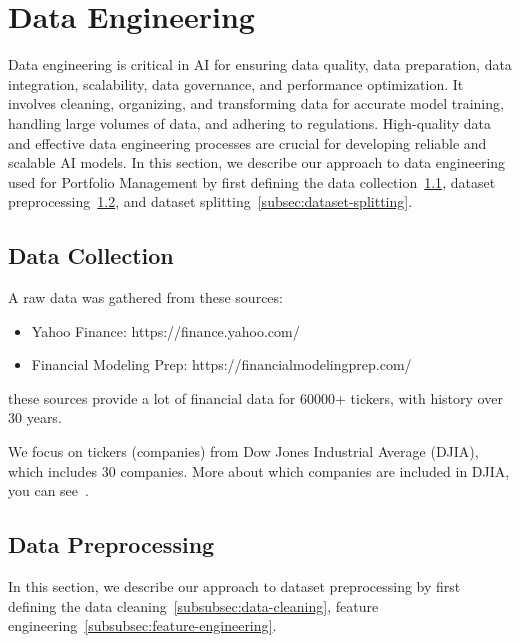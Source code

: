 \documentclass[../xlapes02]{subfiles}
\begin{document}
    \section{Data Engineering}\label{sec:data-engineering}
    Data engineering is critical in AI for ensuring data quality, data preparation, data integration, scalability, data governance, and performance optimization. It involves cleaning, organizing, and transforming data for accurate model training, handling large volumes of data, and adhering to regulations. High-quality data and effective data engineering processes are crucial for developing reliable and scalable AI models. In this section, we describe our approach to data engineering used for Portfolio Management by first defining the data collection~\cref{subsec:data-collection}, dataset preprocessing~\cref{subsec:dataset-preprocessing}, and dataset splitting~\cref{subsec:dataset-splitting}.

    \subsection{Data Collection}\label{subsec:data-collection}
    A raw data was gathered from these sources:
    \begin{itemize}
        \item Yahoo Finance: https://finance.yahoo.com/
        \item Financial Modeling Prep: https://financialmodelingprep.com/
    \end{itemize}
    these sources provide a lot of financial data for 60000+ tickers, with history over 30 years.

    We focus on tickers (companies) from Dow Jones Industrial Average (DJIA), which includes 30 companies. More about which companies are included in DJIA, you can see~\cite{enwiki:1141766585}.

    \subsection{Data Preprocessing}\label{subsec:dataset-preprocessing}
    In this section, we describe our approach to dataset preprocessing by first defining the data cleaning~\cref{subsubsec:data-cleaning}, feature engineering~\cref{subsubsec:feature-engineering}.
\end{document}
